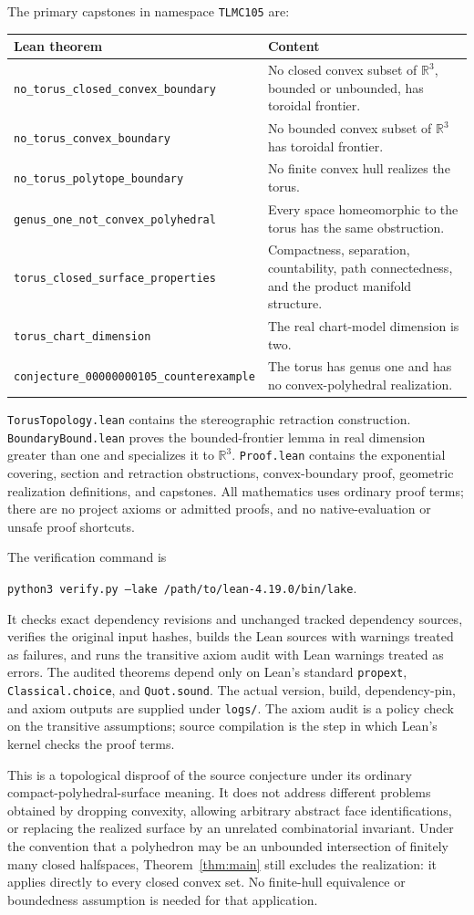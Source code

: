 \documentclass[11pt]{article}
\newcommand{\R}{\mathbb R}
\newcommand{\code}[1]{\texttt{\small #1}}
\begin{document}
The primary capstones in namespace \code{TLMC105} are:
\begin{longtable}{@{}p{}p{}@{}}
\toprule
Lean theorem & Content\\
\midrule
\code{no\_torus\_closed\_convex\_boundary} & No closed convex subset of $\R^3$, bounded or unbounded, has toroidal frontier.\\[4pt]
\code{no\_torus\_convex\_boundary} & No bounded convex subset of $\R^3$ has toroidal frontier.\\[4pt]
\code{no\_torus\_polytope\_boundary} & No finite convex hull realizes the torus.\\[4pt]
\code{genus\_one\_not\_convex\_polyhedral} & Every space homeomorphic to the torus has the same obstruction.\\[4pt]
\code{torus\_closed\_surface\_properties} & Compactness, separation, countability, path connectedness, and the product manifold structure.\\[4pt]
\code{torus\_chart\_dimension} & The real chart-model dimension is two.\\[4pt]
\code{conjecture\_00000000105\_counterexample} & The torus has genus one and has no convex-polyhedral realization.\\
\bottomrule
\end{longtable}

\code{TorusTopology.lean} contains the stereographic retraction construction. \code{BoundaryBound.lean} proves the bounded-frontier lemma in real dimension greater than one and specializes it to $\R^3$. \code{Proof.lean} contains the exponential covering, section and retraction obstructions, convex-boundary proof, geometric realization definitions, and capstones. All mathematics uses ordinary proof terms; there are no project axioms or admitted proofs, and no native-evaluation or unsafe proof shortcuts.

The verification command is
\begin{center}
\code{python3 verify.py --lake /path/to/lean-4.19.0/bin/lake}.
\end{center}
It checks exact dependency revisions and unchanged tracked dependency sources, verifies the original input hashes, builds the Lean sources with warnings treated as failures, and runs the transitive axiom audit with Lean warnings treated as errors. The audited theorems depend only on Lean's standard \code{propext}, \code{Classical.choice}, and \code{Quot.sound}. The actual version, build, dependency-pin, and axiom outputs are supplied under \code{logs/}. The axiom audit is a policy check on the transitive assumptions; source compilation is the step in which Lean's kernel checks the proof terms.

This is a topological disproof of the source conjecture under its ordinary compact-polyhedral-surface meaning. It does not address different problems obtained by dropping convexity, allowing arbitrary abstract face identifications, or replacing the realized surface by an unrelated combinatorial invariant. Under the convention that a polyhedron may be an unbounded intersection of finitely many closed halfspaces, Theorem~\ref{thm:main} still excludes the realization: it applies directly to every closed convex set. No finite-hull equivalence or boundedness assumption is needed for that application.
\end{document}
